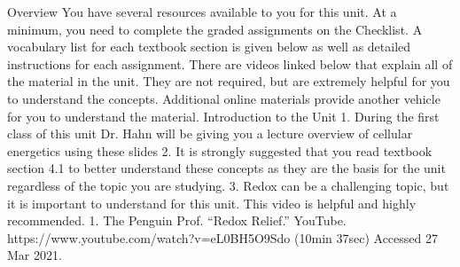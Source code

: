 ﻿Overview
You have several resources available to you for this unit. At a minimum, you need to complete the graded assignments on the Checklist. 
A vocabulary list for each textbook section is given below as well as detailed instructions for each assignment.
There are videos linked below that explain all of the material in the unit. They are not required, but are extremely helpful for you to understand the concepts. Additional online materials provide another vehicle for you to understand the material.
Introduction to the Unit
1. During the first class of this unit Dr. Hahn will be giving you a lecture overview of cellular energetics using these slides
2. It is strongly suggested that you read textbook section 4.1 to better understand these concepts as they are the basis for the unit regardless of the topic you are studying.
3. Redox can be a challenging topic, but it is important to understand for this unit. This video is helpful and highly recommended.
   1. The Penguin Prof. “Redox Relief.” YouTube. https://www.youtube.com/watch?v=eL0BH5O9Sdo (10min 37sec) Accessed 27 Mar 2021.



